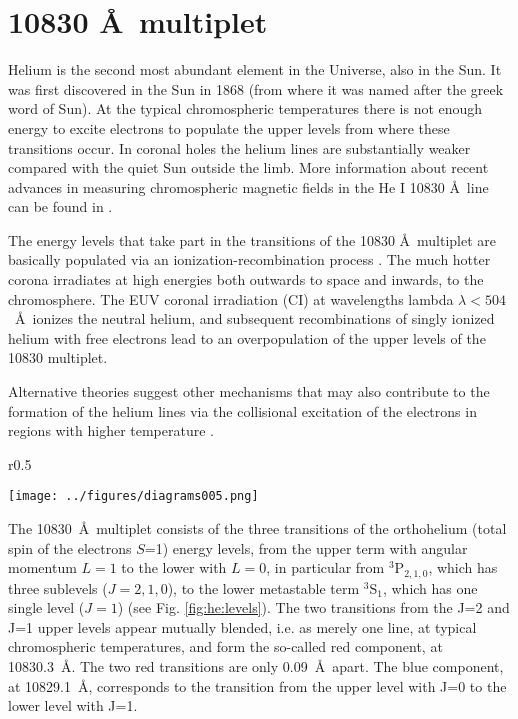 \section{ 10830 \AA\, multiplet \label{sec:limb:he}}
Helium is the second most abundant element in the Universe, also in the Sun. It was first discovered in the Sun in 1868 (from where it was named after the greek word of Sun). 
At the typical chromospheric temperatures there is not enough energy to excite electrons to populate the upper levels from where these transitions occur. In coronal holes  the helium lines are substantially weaker compared with the quiet Sun outside the limb. More information about recent advances in measuring chromospheric magnetic fields in the He I 10830 \AA\,  line can be found in \cite{2007AdSpR..39.1734L}.


The energy levels that take part in the transitions of the  10830 \AA\, multiplet are basically populated via an ionization-recombination process \citep{1994isp..book...35A}. The much hotter corona irradiates at high energies both outwards to space and inwards, to the chromosphere. The EUV coronal irradiation (CI)  at 
wavelengths lambda $\lambda<504$~\AA\ ionizes the neutral helium, and subsequent recombinations of singly ionized helium with free electrons lead to an overpopulation of the upper levels of the  10830 multiplet.

Alternative theories suggest other mechanisms that may also contribute to the formation of the helium lines via the collisional excitation of the electrons in regions with higher temperature \citep[e.g.][]{1997ApJ...489..375A}.


\begin{wrapfigure}[18]{r}{0.5\textwidth}
\vspace{-1.1cm}
\begin{center}
\texttt{[image: ../figures/diagrams005.png]}
\caption{Schematic Grotrian diagram for the  10830~\AA\ multiplet emission lines.}
\label{fig:he:levels}
\end{center}
\end{wrapfigure}

The  10830~\AA\ multiplet consists of the three transitions of the orthohelium (total spin of the electrons $S$=1) energy levels, from the upper term with angular momentum $L=1$ to the lower with $L=0$, in particular from  $^3$P$_{2,1,0}$, which has three sublevels ($J=2,1,0$),  to the lower metastable term $ ^3$S$_{1}$, which has one single level ($J=1$) (see Fig. \ref{fig:he:levels}). The two transitions from the J=2 and J=1 upper levels appear mutually blended, i.e. as merely one line, at typical chromospheric temperatures, and form the so-called red component, at 10830.3~\AA. The two red transitions are only 0.09~\AA\ apart.  The blue component, at 10829.1~\AA,  corresponds to the transition from the upper level with J=0  to the lower level with J=1. 


